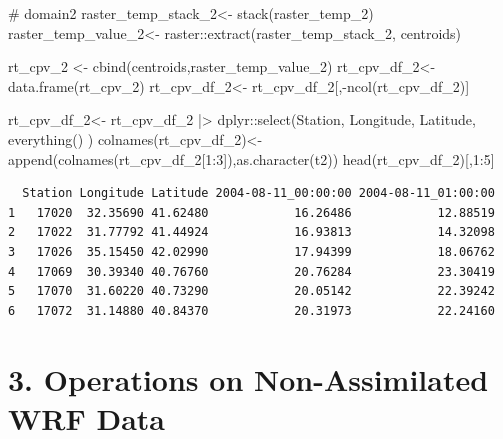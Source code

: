 \documentclass[
  letterpaper,
  DIV=11,
  numbers=noendperiod,
  abstract]{scrartcl}
\newenvironment{Shaded}{\begin{snugshade}}{\end{snugshade}}
\newcommand{\CommentTok}[1]{\textcolor[rgb]{0.37,0.37,0.37}{#1}}
\newcommand{\DecValTok}[1]{\textcolor[rgb]{0.68,0.00,0.00}{#1}}
\newcommand{\FunctionTok}[1]{\textcolor[rgb]{0.28,0.35,0.67}{#1}}
\newcommand{\NormalTok}[1]{\textcolor[rgb]{0.00,0.23,0.31}{#1}}
\newcommand{\OtherTok}[1]{\textcolor[rgb]{0.00,0.23,0.31}{#1}}
\newcommand{\SpecialCharTok}[1]{\textcolor[rgb]{0.37,0.37,0.37}{#1}}
\begin{document}
\begin{Shaded}
\begin{Highlighting}[]
\CommentTok{\# domain2}
\NormalTok{raster\_temp\_stack\_2}\OtherTok{\textless{}{-}} \FunctionTok{stack}\NormalTok{(raster\_temp\_2)}
\NormalTok{raster\_temp\_value\_2}\OtherTok{\textless{}{-}}\NormalTok{ raster}\SpecialCharTok{::}\FunctionTok{extract}\NormalTok{(raster\_temp\_stack\_2, centroids)}

\NormalTok{rt\_cpv\_2 }\OtherTok{\textless{}{-}} \FunctionTok{cbind}\NormalTok{(centroids,raster\_temp\_value\_2)}
\NormalTok{rt\_cpv\_df\_2}\OtherTok{\textless{}{-}} \FunctionTok{data.frame}\NormalTok{(rt\_cpv\_2) }
\NormalTok{rt\_cpv\_df\_2}\OtherTok{\textless{}{-}}\NormalTok{ rt\_cpv\_df\_2[,}\SpecialCharTok{{-}}\FunctionTok{ncol}\NormalTok{(rt\_cpv\_df\_2)]}

\NormalTok{rt\_cpv\_df\_2}\OtherTok{\textless{}{-}} 
\NormalTok{  rt\_cpv\_df\_2 }\SpecialCharTok{|\textgreater{}} 
\NormalTok{  dplyr}\SpecialCharTok{::}\FunctionTok{select}\NormalTok{(Station, Longitude, Latitude,  }\FunctionTok{everything}\NormalTok{() )}
\FunctionTok{colnames}\NormalTok{(rt\_cpv\_df\_2)}\OtherTok{\textless{}{-}} \FunctionTok{append}\NormalTok{(}\FunctionTok{colnames}\NormalTok{(rt\_cpv\_df\_2[}\DecValTok{1}\SpecialCharTok{:}\DecValTok{3}\NormalTok{]),}\FunctionTok{as.character}\NormalTok{(t2))}
\FunctionTok{head}\NormalTok{(rt\_cpv\_df\_2)[,}\DecValTok{1}\SpecialCharTok{:}\DecValTok{5}\NormalTok{]}
\end{Highlighting}
\end{Shaded}

\begin{verbatim}
  Station Longitude Latitude 2004-08-11_00:00:00 2004-08-11_01:00:00
1   17020  32.35690 41.62480            16.26486            12.88519
2   17022  31.77792 41.44924            16.93813            14.32098
3   17026  35.15450 42.02990            17.94399            18.06762
4   17069  30.39340 40.76760            20.76284            23.30419
5   17070  31.60220 40.73290            20.05142            22.39242
6   17072  31.14880 40.84370            20.31973            22.24160
\end{verbatim}

\hypertarget{operations-on-non-assimilated-wrf-data}{%
\section{3. Operations on Non-Assimilated WRF
Data}\label{operations-on-non-assimilated-wrf-data}}
\end{document}
